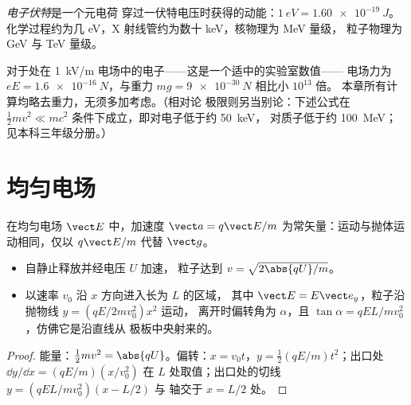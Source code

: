 \begin{definition}[电子伏特]\label{def:b1:charged-particles:eV}
\emph{电子伏特}是一个元电荷
穿过一伏特电压时获得的动能：$\qty{1}{eV} = \qty{1.60e-19}{J}$。
化学过程约为几 eV，X 射线管约为数十 keV，核物理为 MeV 量级，
粒子物理为 GeV 与 TeV 量级。
\end{definition}

\begin{remark}[为何忽略重力]\label{rem:b1:charged-particles:gravity}
对于处在 \qty{1}{kV/m} 电场中的电子——这是一个适中的实验室数值——
电场力为 $eE = \qty{1.6e-16}{N}$，与重力
$mg = \qty{9e-30}{N}$ 相比小 $10^{13}$ 倍。
本章所有计算均略去重力，无须多加考虑。（相对论
极限则另当别论：下述公式在
$\tfrac12 mv^2 \ll mc^2$ 条件下成立，即对电子低于约 \qty{50}{keV}，
对质子低于约 \qty{100}{MeV}；见本科三年级分册。）
\end{remark}

\section{均匀电场}

\begin{proposition}[加速与偏转]\label{prop:b1:charged-particles:efield}
在均匀电场 $\vect E$ 中，加速度 $\vect a = q\vect E/m$
为常矢量：运动与抛体运动相同，仅以 $q\vect E/m$ 代替
$\vect g$。
\begin{itemize}
  \item 自静止释放并经电压 $U$ 加速，
        粒子达到 $v = \sqrt{2\abs{qU}/m}$。
  \item 以速率 $v_0$ 沿 $x$ 方向进入长为 $L$ 的区域，
        其中 $\vect E = E\vect e_y$，粒子沿抛物线 $y = (qE/2mv_0^2)x^2$ 运动，
        离开时偏转角为 $\alpha$，且 $\tan\alpha =
        qEL/mv_0^2$，仿佛它是沿直线从
        极板中央射来的。
\end{itemize}
\end{proposition}

\begin{proof}
能量：$\tfrac12 mv^2 = \abs{qU}$。偏转：$x = v_0t$，$y =
\tfrac12(qE/m)t^2$；出口处 $\dd y/\dd x = (qE/m)(x/v_0^2)$ 在
$L$ 处取值；出口处的切线 $y = (qEL/mv_0^2)(x - L/2)$ 与
轴交于 $x = L/2$ 处。
\end{proof}


